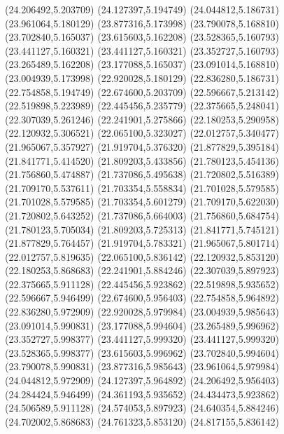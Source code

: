{{\lineto(24.206492,5.203709)
\lineto(24.127397,5.194749)
\lineto(24.044812,5.186731)
\lineto(23.961064,5.180129)
\lineto(23.877316,5.173998)
\lineto(23.790078,5.168810)
\lineto(23.702840,5.165037)
\lineto(23.615603,5.162208)
\lineto(23.528365,5.160793)
\lineto(23.441127,5.160321)
\lineto(23.441127,5.160321)
\lineto(23.352727,5.160793)
\lineto(23.265489,5.162208)
\lineto(23.177088,5.165037)
\lineto(23.091014,5.168810)
\lineto(23.004939,5.173998)
\lineto(22.920028,5.180129)
\lineto(22.836280,5.186731)
\lineto(22.754858,5.194749)
\lineto(22.674600,5.203709)
\lineto(22.596667,5.213142)
\lineto(22.519898,5.223989)
\lineto(22.445456,5.235779)
\lineto(22.375665,5.248041)
\lineto(22.307039,5.261246)
\lineto(22.241901,5.275866)
\lineto(22.180253,5.290958)
\lineto(22.120932,5.306521)
\lineto(22.065100,5.323027)
\lineto(22.012757,5.340477)
\lineto(21.965067,5.357927)
\lineto(21.919704,5.376320)
\lineto(21.877829,5.395184)
\lineto(21.841771,5.414520)
\lineto(21.809203,5.433856)
\lineto(21.780123,5.454136)
\lineto(21.756860,5.474887)
\lineto(21.737086,5.495638)
\lineto(21.720802,5.516389)
\lineto(21.709170,5.537611)
\lineto(21.703354,5.558834)
\lineto(21.701028,5.579585)
\lineto(21.701028,5.579585)
\lineto(21.703354,5.601279)
\lineto(21.709170,5.622030)
\lineto(21.720802,5.643252)
\lineto(21.737086,5.664003)
\lineto(21.756860,5.684754)
\lineto(21.780123,5.705034)
\lineto(21.809203,5.725313)
\lineto(21.841771,5.745121)
\lineto(21.877829,5.764457)
\lineto(21.919704,5.783321)
\lineto(21.965067,5.801714)
\lineto(22.012757,5.819635)
\lineto(22.065100,5.836142)
\lineto(22.120932,5.853120)
\lineto(22.180253,5.868683)
\lineto(22.241901,5.884246)
\lineto(22.307039,5.897923)
\lineto(22.375665,5.911128)
\lineto(22.445456,5.923862)
\lineto(22.519898,5.935652)
\lineto(22.596667,5.946499)
\lineto(22.674600,5.956403)
\lineto(22.754858,5.964892)
\lineto(22.836280,5.972909)
\lineto(22.920028,5.979984)
\lineto(23.004939,5.985643)
\lineto(23.091014,5.990831)
\lineto(23.177088,5.994604)
\lineto(23.265489,5.996962)
\lineto(23.352727,5.998377)
\lineto(23.441127,5.999320)
\lineto(23.441127,5.999320)
\lineto(23.528365,5.998377)
\lineto(23.615603,5.996962)
\lineto(23.702840,5.994604)
\lineto(23.790078,5.990831)
\lineto(23.877316,5.985643)
\lineto(23.961064,5.979984)
\lineto(24.044812,5.972909)
\lineto(24.127397,5.964892)
\lineto(24.206492,5.956403)
\lineto(24.284424,5.946499)
\lineto(24.361193,5.935652)
\lineto(24.434473,5.923862)
\lineto(24.506589,5.911128)
\lineto(24.574053,5.897923)
\lineto(24.640354,5.884246)
\lineto(24.702002,5.868683)
\lineto(24.761323,5.853120)
\lineto(24.817155,5.836142)
}}
